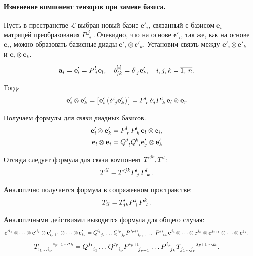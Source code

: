 \paragraph{Изменение компонент тензоров при замене базиса.}
Пусть в пространстве $\mathcal{L}$ выбран новый базис $\mathbf{e}'_i$, связанный с базисом $\mathbf{e}_i$ матрицей преобразования $\tensor{P}{^j_i}$. Очевидно, что на основе $\mathbf{e}'_i$, так же, как на основе $\mathbf{e}_i$, можно образовать базисные диады $\mathbf{e}'_i\otimes\mathbf{e}'_k$. Установим связть между $\mathbf{e}'_i\otimes\mathbf{e}'_k$ и $\mathbf{e}_i\otimes\mathbf{e}_k$.

\begin{equation*}
	\mathbf{a}_i = \mathbf{e}'_i = \tensor{P}{^l_i}\mathbf{e}_l,\quad b^{[i]}_{jk}=\tensor{\delta}{^i_j}\mathbf{e}'_k,\quad i,j,k=\overline{1,\,n}.
\end{equation*}

Тогда
\begin{equation*}
	\mathbf{e}'_i\otimes\mathbf{e}'_k = \left[\mathbf{e}'_i\left(\tensor{\delta}{^i_j}\mathbf{e}'_k\right)\right] = \tensor{P}{^l_r}\delta^r_j\tensor{P}{^i_k}\mathbf{e}_l\otimes\mathbf{e}_r
\end{equation*}

Получаем формулы для связи диадных базисов:
\begin{align*}
	\mathbf{e}'_i\otimes\mathbf{e}'_k &= \tensor{P}{^l_r}\tensor{P}{^i_k}\mathbf{e}_l\otimes\mathbf{e}_i,\\
	\mathbf{e}_l\otimes\mathbf{e}_i &= \tensor{Q}{^j_l}\tensor{Q}{^k_i}\mathbf{e}'_j\otimes\mathbf{e}'_k
\end{align*}

Отсюда следует формула для связи компонент $T'^{jk}, T^{il}$:
\begin{equation*}
	T^{il} = T'^{jk}\tensor{P}{^i_j}\tensor{P}{^l_k}.
\end{equation*}

Аналогично получается формула в сопряженном пространстве:
\begin{equation*}
	T_{il} = T'_{jk}\tensor{P}{^j_i}\tensor{P}{^k_l}.
\end{equation*}

\begin{theorem}
	Аналогичными действиями выводится формула для общего случая:
	\begin{equation*}
		\mathbf{e}'^{i_1}\otimes\dots\otimes\mathbf{e}'^{i_p}\otimes\mathbf{e}'_{i_p+1}\otimes\dots\otimes\mathbf{e}'_{i_k} = 
		\tensor{Q}{^{i_1}_{j_1}}\dots\tensor{Q}{^{i_p}_{j_p}}\tensor{P}{^{j_{p+1}}_{i_{p+1}}}\dots\tensor{P}{^{j_k}_{i_k}}\mathbf{e}^{j_1}\otimes\dots\otimes\mathbf{e}^{j_p}\otimes\mathbf{e}^{j_{p+1}}\otimes\dots\otimes\mathbf{e}^{j_k}.
	\end{equation*}
	\begin{equation*}
\tensor{T}{_{i_1\dots i_p}^{i_{p+1}\dots i_k}} = \tensor{Q}{^{j_1}_{i_1}}\dots\tensor{Q}{^{j_p}_{i_p}}\tensor{P}{^{i_{p+1}}_{j_{p+1}}}\dots\tensor{P}{^{i_k}_{j_k}}\tensor{T}{_{j_1\dots j_p}^{j_{p+1}\dots j_k}}.
	\end{equation*}
\end{theorem}

